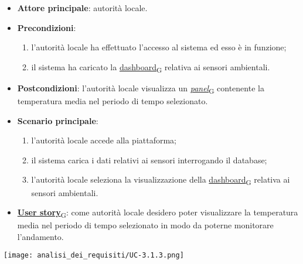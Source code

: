 \newpage
{}
\begin{itemize}
	\item \textbf{Attore principale}: autorità locale.
	\item \textbf{Precondizioni}:
	      \begin{enumerate}
		      \item l'autorità locale ha effettuato l'accesso al sistema ed esso è in funzione;
		      \item il sistema ha caricato la \href{https://7last.github.io/docs/pb/documentazione-interna/glossario\#dashboard}{dashboard\textsubscript{G}} relativa ai sensori ambientali.
	      \end{enumerate}
	\item \textbf{Postcondizioni}: l'autorità locale visualizza un \href{https://7last.github.io/docs/pb/documentazione-interna/glossario\#panel}{\textit{panel}\textsubscript{G}} contenente la temperatura media nel periodo di tempo selezionato.
	\item \textbf{Scenario principale}:
	      \begin{enumerate}
		      \item l'autorità locale accede alla piattaforma;
		      \item il sistema carica i dati relativi ai sensori interrogando il database;
		      \item l'autorità locale seleziona la visualizzazione della \href{https://7last.github.io/docs/pb/documentazione-interna/glossario\#dashboard}{dashboard\textsubscript{G}} relativa ai sensori ambientali.
	      \end{enumerate}
	\item \href{https://7last.github.io/docs/pb/documentazione-interna/glossario\#user-story}{\textbf{User story}\textsubscript{G}}: come autorità locale desidero poter visualizzare la temperatura media nel periodo di tempo selezionato
	      in modo da poterne monitorare l'andamento.
\end{itemize}
\begin{center}
	\texttt{[image: analisi\_dei\_requisiti/UC-3.1.3.png]}
\end{center}

